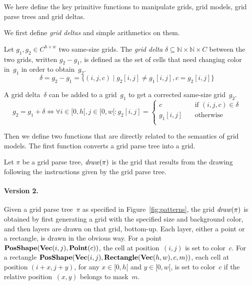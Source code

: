 \documentclass[a4paper]{llncs}
\newcommand{\nat}{\mathbb{N}}
\begin{document}
We here define the key primitive functions to manipulate grids, grid
models, grid parse trees and grid deltas.

We first define {\em grid deltas} and simple arithmetics on them.

\begin{definition}
  Let $g_1, g_2 \in C^{h \times w}$ two same-size grids. The {\em grid
    delta} $\delta \subseteq \nat \times \nat \times C$ between the
  two grids, written $g_2 - g_1$, is defined as the set of cells that
  need changing color in~$g_1$ in order to obtain~$g_2$.
  \[ \delta = g_2 - g_1 = \{ (i,j,c) \mid g_2[i,j] \neq g_1[i,j], c = g_2[i,j] \} \]
  
  A grid delta~$\delta$ can be added to a grid~$g_1$ to get a corrected same-size grid~$g_2$.
  \[ g_2 = g_1 + \delta \iff \forall i \in [0,h[, j \in [0,w[: g_2[i,j] =
    \left\{
      \begin{array}{ll}
        c & \quad\textrm{if~} (i,j,c) \in \delta \\
        g_1[i,j] & \quad\textrm{otherwise} \\
      \end{array}\right. \]
\end{definition}

Then we define two functions that are directly related to the
semantics of grid models. The first function converts a grid parse tree
into a grid.

\begin{definition}
  Let $\pi$ be a grid parse tree, ${\it draw}(\pi)$ is the grid that
  results from the drawing following the instructions given by the
  grid parse tree.  
\end{definition}

\paragraph{Version 2.} Given a grid parse tree~$\pi$ as specified in
Figure~\ref{fig:patterns}, the grid ${\it draw}(\pi)$ is obtained by
first generating a grid with the specified size and background color,
and then layers are drawn on that grid, bottom-up. Each layer, either
a point or a rectangle, is drawn in the obvious way. For a point
${\bf PosShape}({\bf Vec}(i,j), {\bf Point}(c))$, the cell at
position~$(i,j)$ is set to color~$c$. For a rectangle
${\bf PosShape}({\bf Vec}(i,j), {\bf Rectangle}({\bf Vec}(h,w),c,m))$,
each cell at position $(i+x,j+y)$, for any $x \in [0,h[$ and
$y \in [0,w[$, is set to color~$c$ if the relative position~$(x,y)$
belongs to mask~$m$.
\end{document}
